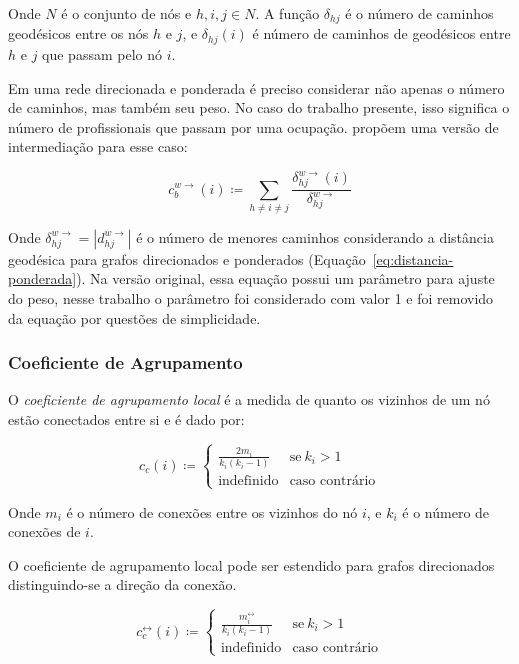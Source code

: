 \documentclass[12pt,a4paper,final]{article}
\newcommand{\defn}{\coloneqq} %
\newcommand{\linkboth}[1]{#1^\leftrightarrow} %
\newcommand{\weighteddir}[1]{#1^{w\rightarrow}} %
\begin{document}
Onde $N$ é o conjunto de nós e $h, i, j \in N$. A função $\delta_{hj}$ é o número de caminhos geodésicos entre os nós $h$ e $j$, e $\delta_{hj}(i)$ é número de caminhos de geodésicos entre $h$ e $j$ que passam pelo nó $i$.

Em uma rede direcionada e ponderada é preciso considerar não apenas o número de caminhos, mas também seu peso. No caso do trabalho presente, isso significa o número de profissionais que passam por uma ocupação.  propõem uma versão de intermediação para esse caso:

\begin{equation}
\weighteddir{c}_{b}(i) \defn \sum_{h \neq i \neq j} \frac{\weighteddir{\delta}_{hj}(i)}{\weighteddir{\delta}_{hj}}
\end{equation}

Onde $\weighteddir{\delta}_{hj} = |\weighteddir{d}_{hj}|$ é o número de menores caminhos considerando a distância geodésica para grafos direcionados e ponderados (Equação~\ref{eq:distancia-ponderada}). Na versão original, essa equação possui um parâmetro para ajuste do peso, nesse trabalho o parâmetro foi considerado com valor 1 e foi removido da equação por questões de simplicidade.

\subsubsection{Coeficiente de Agrupamento} \label{sec:coeficiente-agrupamento}

O \textit{coeficiente de agrupamento local} é a medida de quanto os vizinhos de um nó estão conectados entre si e é dado por:

\begin{equation}
c_c(i) \defn \begin{cases}
    \frac{2m_i}{k_i(k_i - 1)} & \text{se}\ k_i > 1 \\
    \text{indefinido}         & \text{caso contrário}
  \end{cases}
\end{equation}

Onde $m_i$ é o número de conexões entre os vizinhos do nó $i$, e $k_i$ é o número de conexões de $i$.

O coeficiente de agrupamento local pode ser estendido para grafos direcionados distinguindo-se a direção da conexão.

\begin{equation}
\linkboth{c}_c(i) \defn \begin{cases}
    \frac{\linkboth{m}_i}{k_i(k_i - 1)} & \text{se}\ k_i > 1 \\
    \text{indefinido}                  & \text{caso contrário}
  \end{cases}
\end{equation}
\end{document}
